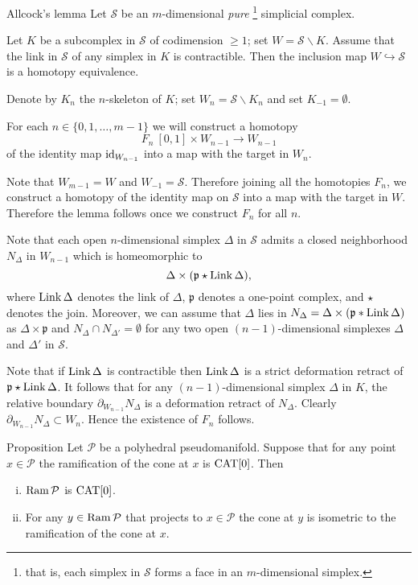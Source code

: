 \documentclass{compositio}
\begin{document}
\begin{thm}{Allcock's lemma}\label{lem:allcock}
Let $\mathcal{S}$ be an $m$-dimensional \emph{pure}%
\footnote{that is, each simplex in $\mathcal{S}$ forms a face in an $m$-dimensional simplex.} simplicial complex.

Let $K$ be a subcomplex in $\mathcal{S}$ of codimension $\ge 1$;
set $W=\mathcal{S}\backslash K$.
Assume that the link in  $\mathcal{S}$  of any simplex in $K$ is contractible.
Then the inclusion map $W\hookrightarrow\mathcal{S}$ is a homotopy equivalence.
\end{thm}


Denote by $K_n$ the $n$-skeleton of $K$;
set $W_n=\mathcal{S}\backslash K_n$
and
set $K_{-1}=\emptyset$.

For each $n\in \{0,1,\dots,m-1\}$
we will construct a homotopy
$$F_n\:[0,1]\times W_{n-1}\to W_{n-1}$$
of the identity map $\mathop{\rm id}\nolimits_{W_{n-1}}$
into a map with the target in $W_{n}$.

Note that $W_{m-1}=W$ and $W_{-1}=\mathcal{S}$.
Therefore joining all the homotopies $F_n$,
we construct a  homotopy of the identity map on ${\mathcal{S}}$ into a map with the target in $W$.
Therefore the lemma follows once we construct  $F_n$ for all $n$.

Note that each open $n$-dimensional simplex $\Delta$ in $\mathcal{S}$ admits a closed neighborhood $N_\Delta$ in $W_{n-1}$ which is homeomorphic to
$$\Delta\times (\mathfrak{p}\star\mathop{\rm Link}\Delta),$$
where $\mathop{\rm Link}\Delta$ denotes the link of $\Delta$,
$\mathfrak{p}$ denotes a one-point complex, and ${\star}$ denotes the join.
Moreover, we can assume that $\Delta$ lies in $N_\Delta=\Delta\times (\mathfrak{p}*\mathop{\rm Link}\Delta)$ as $\Delta\times \mathfrak{p}$
and $N_\Delta\cap N_{\Delta'}=\emptyset$ for any two open $(n-1)$-dimensional simplexes $\Delta$ and $\Delta'$ in $\mathcal{S}$.

Note that if $\mathop{\rm Link}\Delta$ is contractible
then  $\mathop{\rm Link}\Delta$ is a strict deformation retract of $\mathfrak{p}\star\mathop{\rm Link}\Delta$.
It follows that for any $(n-1)$-dimensional simplex $\Delta$ in $K$,
the relative boundary  $\partial_{W_{n-1}}N_\Delta$
is a deformation retract of $N_\Delta$.
Clearly $\partial_{W_{n-1}}N_\Delta\subset W_n$.
Hence the existence of $F_n$ follows.
\qeds


\begin{thm}{Proposition}\label{orbianalog}
Let $\mathcal P$ be a polyhedral pseudomanifold.
Suppose that for any point $x\in \mathcal P$ the ramification of the cone at $x$ is $\mathrm{CAT}[0]$.
Then
\begin{enumerate}[(i)]
\item\label{orbianalog:i} $\mathop{\rm Ram}\nolimits \mathcal P$ is $\mathrm{CAT}[0]$.
\item\label{orbianalog:ii} For any $y\in \mathop{\rm Ram}\nolimits \mathcal P$ that projects to $x\in \mathcal P$
the cone at $y$ is isometric to the ramification of the cone at $x$.
\end{enumerate}
\end{thm}
\end{document}

